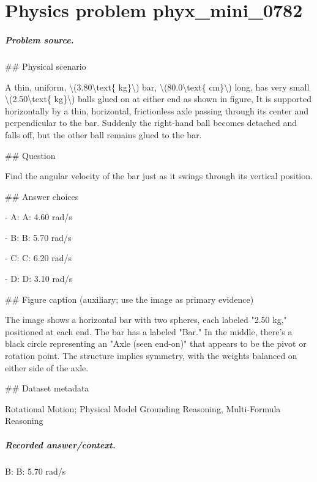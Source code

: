 
\chapter{Physics problem phyx\_mini\_0782}
\label{ch:PhyXMiniProblems_problem_phyx_mini_0782}

\paragraph{Problem source.}
\#\# Physical scenario

A thin, uniform, \textbackslash{}(3.80\textbackslash{}text\{ kg\}\textbackslash{}) bar, \textbackslash{}(80.0\textbackslash{}text\{ cm\}\textbackslash{}) long, has very small \textbackslash{}(2.50\textbackslash{}text\{ kg\}\textbackslash{}) balls glued on at either end as shown in figure, It is supported horizontally by a thin, horizontal, frictionless axle passing through its center and perpendicular to the bar. Suddenly the right-hand ball becomes detached and falls off, but the other ball remains glued to the bar.

\#\# Question

Find the angular velocity of the bar just as it swings through its vertical position.

\#\# Answer choices

- A: A: 4.60 rad/s

- B: B: 5.70 rad/s

- C: C: 6.20 rad/s

- D: D: 3.10 rad/s

\#\# Figure caption (auxiliary; use the image as primary evidence)

The image shows a horizontal bar with two spheres, each labeled "2.50 kg," positioned at each end. The bar has a labeled "Bar." In the middle, there's a black circle representing an "Axle (seen end-on)" that appears to be the pivot or rotation point. The structure implies symmetry, with the weights balanced on either side of the axle.

\#\# Dataset metadata

Rotational Motion; Physical Model Grounding Reasoning, Multi-Formula Reasoning

\paragraph{Recorded answer/context.}
B: B: 5.70 rad/s

